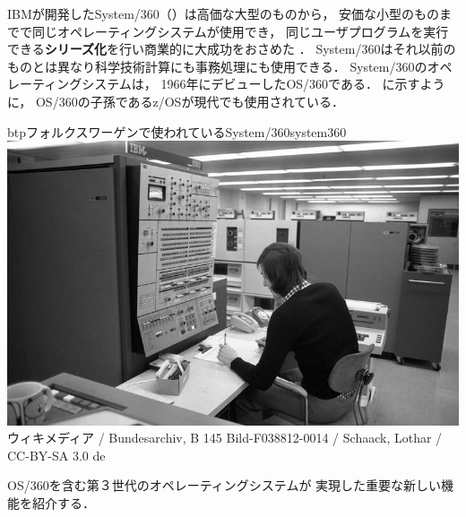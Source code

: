 IBMが開発したSystem/360（）は高価な大型のものから，
安価な小型のものまでで同じオペレーティングシステムが使用でき，
同じユーザプログラムを実行できる{\bf シリーズ化}を行い商業的に大成功をおさめた
\cite{third}．
System/360はそれ以前のものとは異なり科学技術計算にも事務処理にも使用できる．
System/360のオペレーティングシステムは，
1966年にデビューしたOS/360である．
に示すように，
OS/360の子孫であるz/OSが現代でも使用されている\cite{os360}．

\begin{myfig}{btp}{フォルクスワーゲンで使われているSystem/360}{system360}
\includegraphics[scale=0.25]
{Photo/Bundesarchiv_B_145_Bild-F038812-0014,_Wolfsburg,_VW_Autowerk.jpg}\\
{\small
ウィキメディア /
Bundesarchiv, B 145 Bild-F038812-0014 / Schaack, Lothar / CC-BY-SA 3.0 de}
\end{myfig}

OS/360を含む第３世代のオペレーティングシステムが
実現した重要な新しい機能を紹介する．


